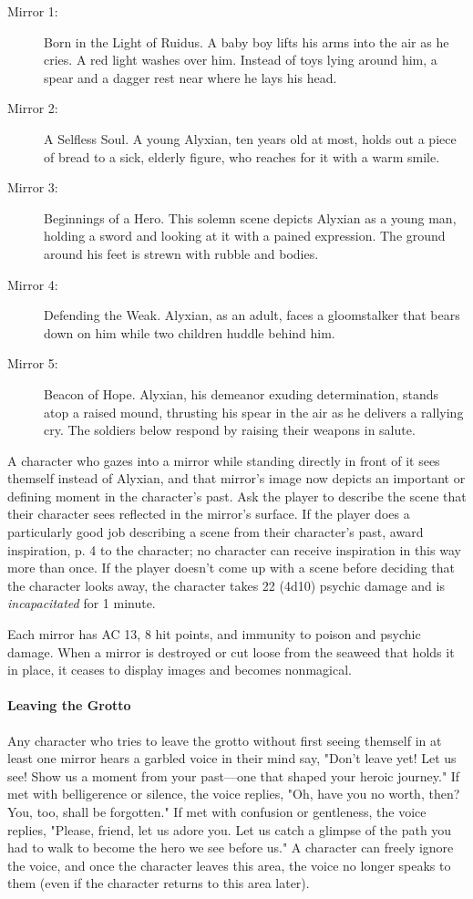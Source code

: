 \documentclass[letterpaper, 11pt, bg=full, twocolumn]{dndbook}
\begin{document}
\begin{description}
\item[Mirror 1:] Born in the Light of Ruidus. A baby boy lifts his arms into the air as he cries. A red light washes over him. Instead of toys lying around him, a spear and a dagger rest near where he lays his head.
\item[Mirror 2:] A Selfless Soul. A young Alyxian, ten years old at most, holds out a piece of bread to a sick, elderly figure, who reaches for it with a warm smile.
\item[Mirror 3:] Beginnings of a Hero. This solemn scene depicts Alyxian as a young man, holding a sword and looking at it with a pained expression. The ground around his feet is strewn with rubble and bodies.
\item[Mirror 4:] Defending the Weak. Alyxian, as an adult, faces a gloomstalker that bears down on him while two children huddle behind him.
\item[Mirror 5:] Beacon of Hope. Alyxian, his demeanor exuding determination, stands atop a raised mound, thrusting his spear in the air as he delivers a rallying cry. The soldiers below respond by raising their weapons in salute.
\end{description}

A character who gazes into a mirror while standing directly in front of it sees themself instead of Alyxian, and that mirror's image now depicts an important or defining moment in the character's past. Ask the player to describe the scene that their character sees reflected in the mirror's surface. If the player does a particularly good job describing a scene from their character's past, award inspiration, p. 4 to the character; no character can receive inspiration in this way more than once. If the player doesn't come up with a scene before deciding that the character looks away, the character takes 22 (4d10) psychic damage and is \textit{incapacitated} for 1 minute.

Each mirror has AC 13, 8 hit points, and immunity to poison and psychic damage. When a mirror is destroyed or cut loose from the seaweed that holds it in place, it ceases to display images and becomes nonmagical.

\paragraph{Leaving the Grotto}

Any character who tries to leave the grotto without first seeing themself in at least one mirror hears a garbled voice in their mind say, "Don't leave yet! Let us see! Show us a moment from your past---one that shaped your heroic journey." If met with belligerence or silence, the voice replies, "Oh, have you no worth, then? You, too, shall be forgotten." If met with confusion or gentleness, the voice replies, "Please, friend, let us adore you. Let us catch a glimpse of the path you had to walk to become the hero we see before us." A character can freely ignore the voice, and once the character leaves this area, the voice no longer speaks to them (even if the character returns to this area later).
\end{document}
